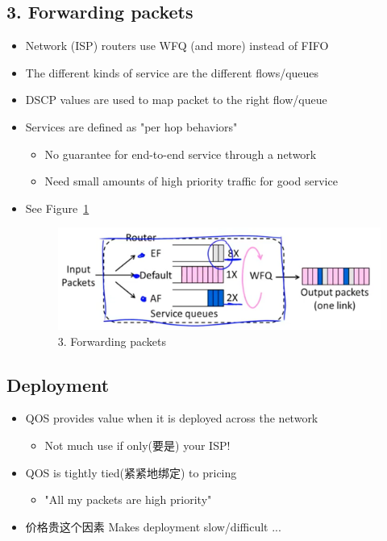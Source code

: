 \documentclass[12pt]{ctexart}   %
\begin{document}
	\subsection{{\color{blue} 3.} Forwarding packets}
	\begin{itemize}
		\item Network (ISP) routers use WFQ (and more) instead of FIFO
		\item The different kinds of service are the different flows/queues
		\item DSCP values are used to map packet to the right flow/queue
		
		\item Services are defined as "per hop behaviors"
		\begin{itemize}
			\item No guarantee for end-to-end service through a network
			\item Need small amounts of high priority traffic for good service
		\end{itemize}
		\item See Figure~\ref{fig:9-6-7}
		  
		\begin{figure}[h!] %
		\centering
		\includegraphics[scale=0.7]{images/9-6-7}
		\caption{ 3. Forwarding packets }
		\label{fig:9-6-7}
		\end{figure}
	\end{itemize}

	\subsection{Deployment}
	\begin{itemize}
		\item QOS provides value when it is deployed across the network
		\begin{itemize}
			\item Not much use if only(要是) your ISP!
		\end{itemize}

		\item  QOS is tightly tied(紧紧地绑定) to pricing
		\begin{itemize}
			\item "All my packets are high priority"
		\end{itemize}

		\item  价格贵这个因素 Makes deployment slow/difficult ...
	\end{itemize}
\end{document}
